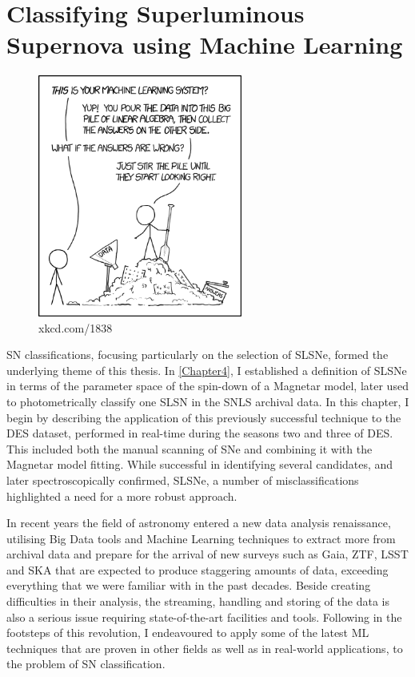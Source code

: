 \chapter{Classifying Superluminous Supernova using Machine Learning}
\label{Chapter5}

\begin{figure}[H]
  \centering
  \includegraphics[width=0.6\textwidth]{Figures/xkcd/chapter5.png}
  \caption*{xkcd.com/1838}
\end{figure}

SN classifications, focusing particularly on the selection of SLSNe, formed the underlying theme of this thesis. In \cref{Chapter4}, I established a definition of SLSNe in terms of the parameter space of the spin-down of a Magnetar model, later used to photometrically classify one SLSN in the SNLS archival data. In this chapter, I begin by describing the application of this previously successful technique to the DES dataset, performed in real-time during the seasons two and three of DES. This included both the manual scanning of SNe and combining it with the Magnetar model fitting. While successful in identifying several candidates, and later spectroscopically confirmed, SLSNe, a number of misclassifications highlighted a need for a more robust approach.

In recent years the field of astronomy entered a new data analysis renaissance, utilising Big Data tools and Machine Learning techniques to extract more from archival data and prepare for the arrival of new surveys such as Gaia, ZTF, LSST and SKA that are expected to produce staggering amounts of data, exceeding everything that we were familiar with in the past decades. Beside creating difficulties in their analysis, the streaming, handling and storing of the data is also a serious issue requiring state-of-the-art facilities and tools. Following in the footsteps of this revolution, I endeavoured to apply some of the latest ML techniques that are proven in other fields as well as in real-world applications, to the problem of SN classification.

